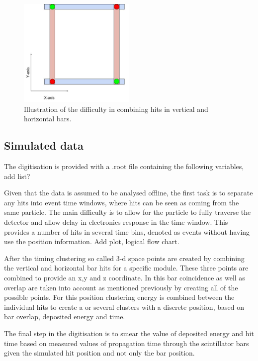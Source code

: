 \begin{figure}[h!]
\centering
\includegraphics[width=0.5\textwidth]{figures/BarsAmbi.jpg}
\caption{Illustration of the difficulty in combining hits in vertical and horizontal bars.}
\label{fig:BarAmbi}
\end{figure}

\subsection{Simulated data}

The digitisation is provided with a .root file containing the following variables, add list? 

Given that the data is assumed to be analysed offline, the first task is to separate any hits into event time windows, where hits can be seen as coming from the same particle. The main difficulty is to allow for the particle to fully traverse the detector and allow delay in electronics response in the time window. This provides a number of hits in several time bins, denoted as events without having use the position information. Add plot, logical flow chart.

After the timing clustering so called 3-d space points are created by combining the vertical and horizontal bar hits for a specific module. These three points are combined to provide an x,y and z coordinate. In this bar coincidence as well as overlap are taken into account as mentioned previously by creating all of the possible points. For this position clustering energy is combined between the individual hits to create a or several clusters with a discrete position, based on bar overlap, deposited energy and time.

The final step in the digitisation is to smear the value of deposited energy and hit time based on measured values of propagation time through the scintillator bars given the simulated hit position and not only the bar position.

